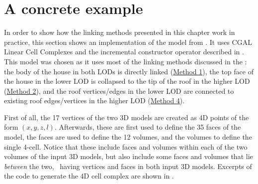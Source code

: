\section{A concrete example}
\label{se:concrete-example}

In order to show how the linking methods presented in this chapter work in practice, this section shows an implementation of the model from .
It uses CGAL Linear Cell Complexes and the incremental constructor operator described in .
This model was chosen as it uses most of the linking methods discussed in the : 
the body of the house in both LODs is directly linked (\hyperref[sss:method1]{Method 1}), 
the top face of the house in the lower LOD is collapsed to the tip of the roof in the higher LOD (\hyperref[sss:method2]{Method 2}), 
and the roof vertices/edges in the lower LOD are connected to existing roof edges/vertices in the higher LOD (\hyperref[sss:method4]{Method 4}).

First of all, the 17 vertices of the two 3D models are created as 4D points of the form $(x, y, z, l)$.
Afterwards, these are first used to define the 35 faces of the model, the faces are used to define the 12 volumes, and the volumes to define the single 4-cell.
Notice that these include faces and volumes within each of the two volumes of the input 3D models, but also include some faces and volumes that lie \emph{between} the two, \ie\ having vertices and faces in both input 3D models.
Excerpts of the code to generate the 4D cell complex are shown in .
\newsavebox{\pointsbox}
\begin{lrbox}{\pointsbox}
\begin{minipage}{0.42\overflowingheadlen}

\end{minipage}
\end{lrbox}

\newsavebox{\constructionbox}
\begin{lrbox}{\constructionbox}
\begin{minipage}{0.5\overflowingheadlen}

\end{minipage}
\end{lrbox}

